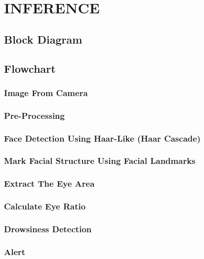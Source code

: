 \chapter{INFERENCE}

\renewcommand{\headrulewidth}{0.5pt}
\renewcommand{\footrulewidth}{0.5pt}
\thispagestyle{plain}
\pagestyle{fancy}
\fancyhf{}
\raggedright
{}

\section{Block Diagram}

\section{Flowchart}

    \subsection{Image From Camera}

    \subsection{Pre-Processing}

    \subsection{Face Detection Using Haar-Like (Haar Cascade)}

    \subsection{Mark Facial Structure Using Facial Landmarks}

    \subsection{Extract The Eye Area}

    \subsection{Calculate Eye Ratio}

    \subsection{Drowsiness Detection}

    \subsection{Alert}